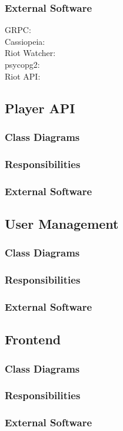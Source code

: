\subsubsection{External Software}
GRPC: \href{https://grpc.io/docs/languages/python/basics/}\\
Cassiopeia: \href{https://github.com/meraki-analytics/cassiopeia}\\
Riot Watcher: \href{https://github.com/pseudonym117/Riot-Watcher}\\
psycopg2: \href{https://pypi.org/project/psycopg2/}\\
Riot API: \href{https://developer.riotgames.com/}\\

\subsection{Player API}
\subsubsection{Class Diagrams}
\subsubsection{Responsibilities}
\subsubsection{External Software}
\subsection{User Management}
\subsubsection{Class Diagrams}
\subsubsection{Responsibilities}
\subsubsection{External Software}
\subsection{Frontend}
\subsubsection{Class Diagrams}
\subsubsection{Responsibilities}
\subsubsection{External Software}